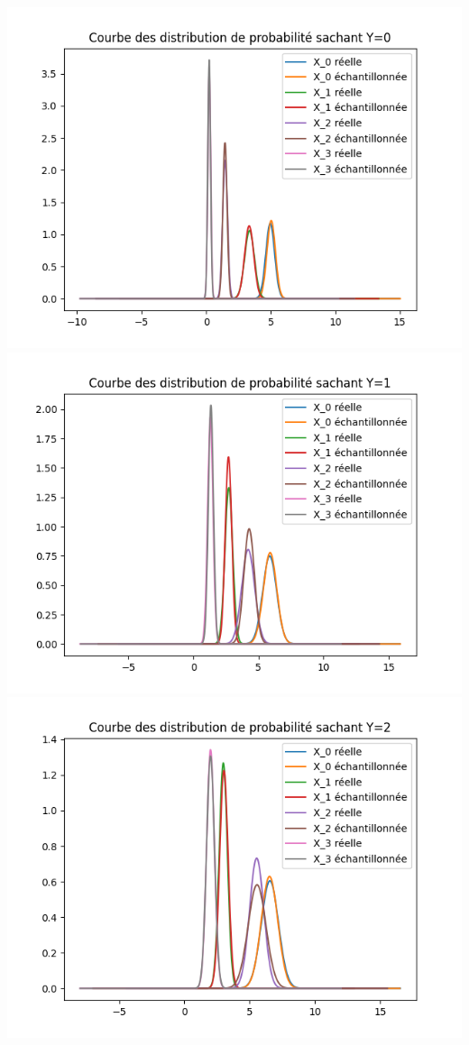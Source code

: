 \documentclass[
]{article}
\begin{document}
\includegraphics{../res/sample_compare_Y_0.png}
\includegraphics{../res/sample_compare_Y_1.png}
\includegraphics{../res/sample_compare_Y_2.png}
\end{document}
